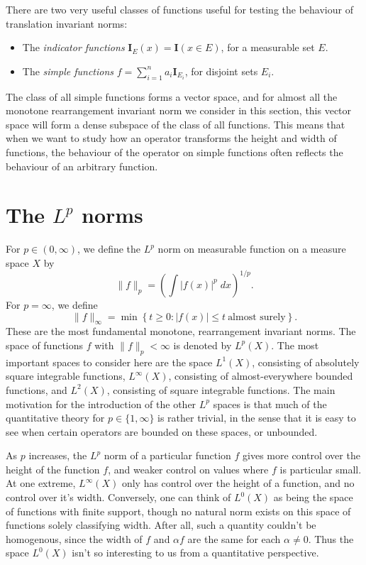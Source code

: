 There are two very useful classes of functions useful for testing the behaviour of translation invariant norms:
%
\begin{itemize}
    \item The \emph{indicator functions} $\mathbf{I}_E(x) = \mathbf{I}(x \in E)$, for a measurable set $E$.
    \item The \emph{simple functions} $f = \sum_{i = 1}^n a_i \mathbf{I}_{E_i}$, for disjoint sets $E_i$.
\end{itemize}
%
The class of all simple functions forms a vector space, and for almost all the monotone rearrangement invariant norm we consider in this section, this vector space will form a dense subspace of the class of all functions. This means that when we want to study how an operator transforms the height and width of functions, the behaviour of the operator on simple functions often reflects the behaviour of an arbitrary function.

\section{The $L^p$ norms}

For $p \in (0,\infty)$, we define the $L^p$ norm on measurable function on a measure space $X$ by
%
\[ \| f \|_p = \left( \int |f(x)|^p\; dx \right)^{1/p}. \]
%
For $p = \infty$, we define
%
\[ \| f \|_\infty = \min \left\{ t \geq 0: |f(x)| \leq t\ \text{almost surely} \right\}. \]
%
These are the most fundamental monotone, rearrangement invariant norms. The space of functions $f$ with $\| f \|_p < \infty$ is denoted by $L^p(X)$. The most important spaces to consider here are the space $L^1(X)$, consisting of absolutely square integrable functions, $L^\infty(X)$, consisting of almost-everywhere bounded functions, and $L^2(X)$, consisting of square integrable functions. The main motivation for the introduction of the other $L^p$ spaces is that much of the quantitative theory for $p \in \{ 1, \infty \}$ is rather trivial, in the sense that it is easy to see when certain operators are bounded on these spaces, or unbounded.

As $p$ increases, the $L^p$ norm of a particular function $f$ gives more control over the height of the function $f$, and weaker control on values where $f$ is particular small. At one extreme, $L^\infty(X)$ only has control over the height of a function, and no control over it's width. Conversely, one can think of $L^0(X)$ as being the space of functions with finite support, though no natural norm exists on this space of functions solely classifying width. After all, such a quantity couldn't be homogenous, since the width of $f$ and $\alpha f$ are the same for each $\alpha \neq 0$. Thus the space $L^0(X)$ isn't so interesting to us from a quantitative perspective.

